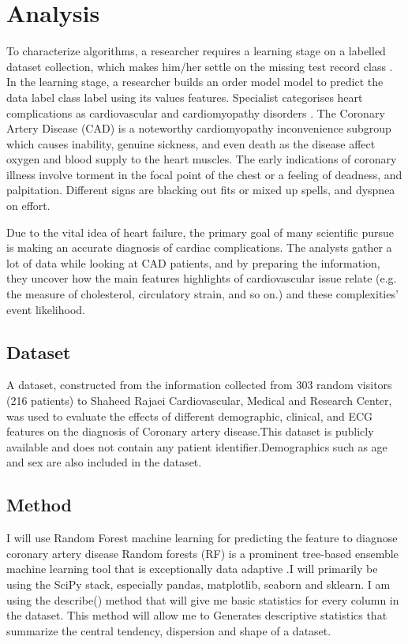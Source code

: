 \documentclass[sigconf]{acmart}
\begin{document}
\section{Analysis}
To characterize algorithms, a researcher requires a learning stage on a labelled dataset collection, which makes him/her settle on the missing test record class \cite{ali}. In the learning stage, a researcher builds an order model model to predict the data label class label using its values features. Specialist categorises heart complications as cardiovascular and cardiomyopathy disorders \cite{ali}. The Coronary Artery Disease (CAD) is a noteworthy cardiomyopathy inconvenience subgroup which causes inability, genuine sickness, and even death as the disease affect oxygen and blood supply to the heart muscles. The early indications of coronary illness involve torment in the focal point of the chest or a feeling of deadness, and palpitation. Different signs are blacking out fits or mixed up spells, and dyspnea on effort.
\par  Due to the vital idea of heart failure, the primary goal of many scientific pursue is making an accurate diagnosis of cardiac complications. The analysts gather a lot of data while looking at CAD patients, and by preparing the information, they uncover how the main features highlights of cardiovascular issue relate (e.g. the measure of cholesterol, circulatory strain, and so on.) and these complexities' event likelihood.

\subsection{Dataset}
A dataset, constructed from the information collected from 303  random  visitors  (216  patients)  to  Shaheed Rajaei Cardiovascular,  Medical  and  Research  Center, was used to evaluate the effects of different demographic, clinical, and ECG features on the diagnosis of Coronary artery disease.This dataset is publicly available and does not contain any patient identifier.Demographics such as age and sex are also included in the dataset.

\subsection{Method}
I will use Random Forest machine learning for predicting the feature to diagnose coronary artery disease Random forests (RF) is a prominent tree-based ensemble machine learning tool that is exceptionally data adaptive \cite{breiman2001random}.I will primarily be using the SciPy stack, especially pandas, matplotlib, seaborn and sklearn.
I am using the describe() method that will give me basic statistics for every column in the dataset. This method will allow me to Generates descriptive statistics that summarize the central tendency, dispersion and shape of a dataset.
\end{document}
